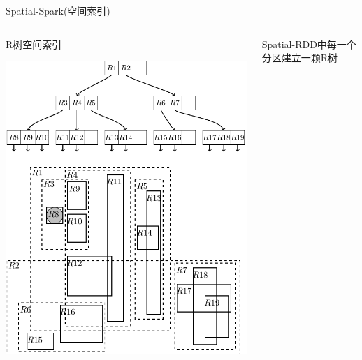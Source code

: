 \begin{frame}[c]{Spatial-Spark(空间索引)}
    \begin{columns}
        \begin{column}{0.6 \textwidth}
        R树空间索引

        \vspace{1em}
        \includegraphics[scale=0.4]{figures/rtree.pdf}
        \end{column}

        \pause
        \begin{column}{0.4 \textwidth}
            Spatial-RDD中每一个分区建立一颗R树
        \end{column}
    \end{columns}
\end{frame}

